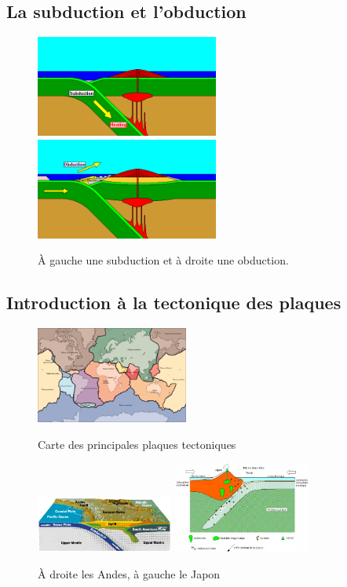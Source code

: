 \documentclass{beamer}
\begin{document}
\subsection{La subduction et l'obduction}
\begin{frame}
  \begin{figure}
    \begin{center}
      \includegraphics[width=6cm]{Images/subduction.png}
      \includegraphics[width=6cm]{Images/obduction.png}
      \caption{À gauche une subduction et à droite une obduction.}
    \end{center}
  \end{figure}
\end{frame}

\subsection{Introduction à la tectonique des plaques}
\begin{frame}
  \begin{center}
    \begin{figure}
      \includegraphics[width=5cm]{Images/Images_Alexis/plaques.png}
      \caption{Carte des principales plaques tectoniques}
      \includegraphics[width=4.5cm]{Images/Images_Alexis/andes.jpg}
      \includegraphics[width=4.5cm]{Images/Images_Alexis/japon.jpg}
      \caption{À droite les Andes, à gauche le Japon}
    \end{figure}
  \end{center}
\end{frame}
\end{document}

